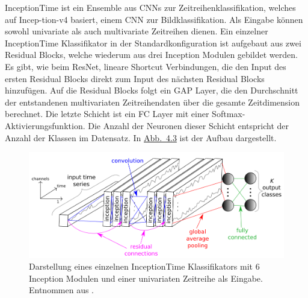 InceptionTime \cite{fawaz_inceptiontime_2020} ist ein Ensemble aus \glspl{CNN} zur Zeitreihenklassifikation, welches auf Incep-tion-v4 basiert, einem \gls{CNN} zur Bildklassifikation. Als Eingabe können sowohl univariate als auch multivariate Zeitreihen dienen.  
Ein einzelner InceptionTime Klassifikator in der Standardkonfiguration ist aufgebaut aus zwei Residual Blocks, welche wiederum aus drei Inception Modulen gebildet werden. Es gibt, wie beim \gls{ResNet}, lineare Shortcut Verbindungen, die den Input des ersten Residual Blocks direkt zum Input des nächsten Residual Blocks hinzufügen. Auf die Residual Blocks folgt ein \gls{GAP} Layer, die den Durchschnitt der entstandenen multivariaten Zeitreihendaten über die gesamte Zeitdimension berechnet. Die letzte Schicht ist ein \gls{FC} Layer mit einer Softmax-Aktivierungsfunktion. Die Anzahl der Neuronen dieser Schicht entspricht der Anzahl der Klassen im Datensatz. In \hyperref[fig:InceptionTime]{Abb.~4.3} ist der Aufbau dargestellt. \cite{fawaz_inceptiontime_2020}

\begin{figure}[!ht]%
\centering
	\includegraphics[width=1\textwidth]{./Bilder/InceptionTime.png}
\caption[Darstellung eines InceptionTime Klassifikators]{Darstellung eines einzelnen InceptionTime Klassifikators mit 6 Inception Modulen und einer univariaten Zeitreihe als Eingabe. Entnommen aus \cite{fawaz_inceptiontime_2020}.} 
\label{fig:InceptionTime}
\end{figure}  


